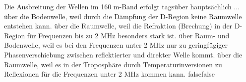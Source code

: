     {Die Ausbreitung der Wellen im 160 m-Band erfolgt tagsüber hauptsächlich ...}
    {über die Bodenwelle, weil durch die Dämpfung der D-Region keine Raumwelle entstehen kann.}
    {über die Raumwelle, weil die Refraktion (Brechung) in der D-Region für Frequenzen bis zu 2 MHz besonders stark ist.}
    {über Raum- und Bodenwelle, weil es bei den Frequenzen unter 2 MHz nur zu geringfügiger Phasenverschiebung zwischen reflektierter und direkter Welle kommt.}
    {über die Raumwelle, weil es in der Troposphäre durch Temperaturinversionen zu Reflexionen für die Frequenzen unter 2 MHz kommen kann.}
    {false}{false}